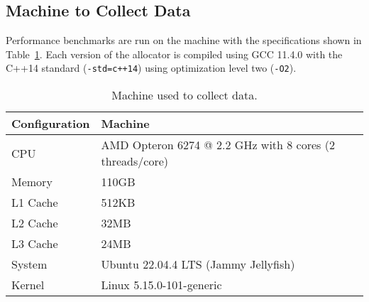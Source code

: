 \subsection{Machine to Collect Data}

Performance benchmarks are run on the machine with the specifications shown in Table~\ref{table:machine}. Each version of the allocator is compiled using GCC 11.4.0 with the C++14 standard (\texttt{-std=c++14}) using optimization level two (\texttt{-O2}).

\begin{table}[H]
    \centering
\begin{tabular}{lp{11.3cm}}
    \textbf{Configuration} & \textbf{Machine} \\ \hline
CPU           & AMD Opteron 6274 @ 2.2 GHz with 8 cores (2 threads/core)\\ \hline
Memory        & 110GB                                                   \\ \hline
L1 Cache      & 512KB                                                   \\ \hline
L2 Cache      & 32MB                                                    \\ \hline
L3 Cache      & 24MB                                                    \\ \hline
System        & Ubuntu 22.04.4 LTS (Jammy Jellyfish)                    \\ \hline
Kernel        & Linux 5.15.0-101-generic
\end{tabular}
\caption{Machine used to collect data.}
\label{table:machine}
\end{table}
